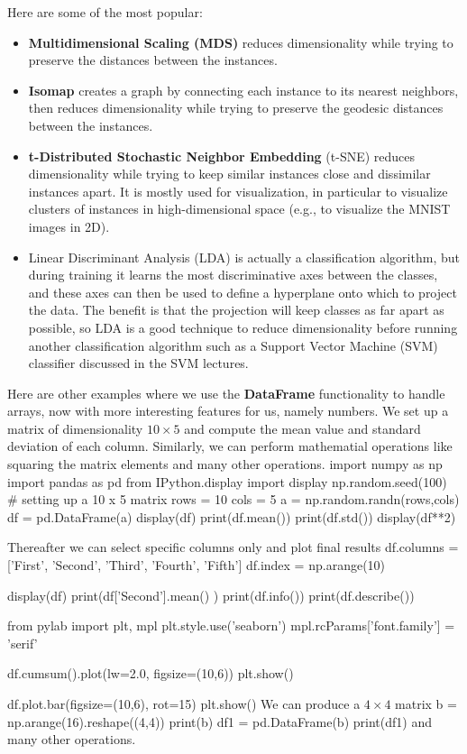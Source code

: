 \documentclass[%
oneside,                 %
final,                   %
10pt]{article}
\begin{document}
Here are some of the most popular:
\begin{itemize}
\item \textbf{Multidimensional Scaling (MDS)} reduces dimensionality while trying to preserve the distances between the instances.

\item \textbf{Isomap} creates a graph by connecting each instance to its nearest neighbors, then reduces dimensionality while trying to preserve the geodesic distances between the instances.

\item \textbf{t-Distributed Stochastic Neighbor Embedding} (t-SNE) reduces dimensionality while trying to keep similar instances close and dissimilar instances apart. It is mostly used for visualization, in particular to visualize clusters of instances in high-dimensional space (e.g., to visualize the MNIST images in 2D).

\item Linear Discriminant Analysis (LDA) is actually a classification algorithm, but during training it learns the most discriminative axes between the classes, and these axes can then be used to define a hyperplane onto which to project the data. The benefit is that the projection will keep classes as far apart as possible, so LDA is a good technique to reduce dimensionality before running another classification algorithm such as a Support Vector Machine (SVM) classifier discussed in the SVM lectures.
\end{itemize}

\noindent
Here are other examples where we use the \textbf{DataFrame} functionality to handle arrays, now with more interesting features for us, namely numbers. We set up a matrix 
of dimensionality $10\times 5$ and compute the mean value and standard deviation of each column. Similarly, we can perform mathematial operations like squaring the matrix elements and many other operations. 
\bpycod
import numpy as np
import pandas as pd
from IPython.display import display
np.random.seed(100)
# setting up a 10 x 5 matrix
rows = 10
cols = 5
a = np.random.randn(rows,cols)
df = pd.DataFrame(a)
display(df)
print(df.mean())
print(df.std())
display(df**2)
\epycod

Thereafter we can select specific columns only and plot final results
\bpycod
df.columns = ['First', 'Second', 'Third', 'Fourth', 'Fifth']
df.index = np.arange(10)

display(df)
print(df['Second'].mean() )
print(df.info())
print(df.describe())

from pylab import plt, mpl
plt.style.use('seaborn')
mpl.rcParams['font.family'] = 'serif'

df.cumsum().plot(lw=2.0, figsize=(10,6))
plt.show()


df.plot.bar(figsize=(10,6), rot=15)
plt.show()
\epycod
We can produce a $4\times 4$ matrix
\bpycod
b = np.arange(16).reshape((4,4))
print(b)
df1 = pd.DataFrame(b)
print(df1)
\epycod
and many other operations. 



\end{document}
